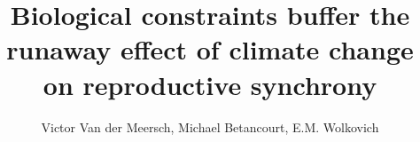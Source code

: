 \documentclass[11pt]{article}
\begin{document}

\linenumbers

\title{Biological constraints buffer the runaway effect of climate change on reproductive synchrony} 

\author{Victor Van der Meersch, Michael Betancourt, E.M. Wolkovich}
\maketitle
  
\end{document}

